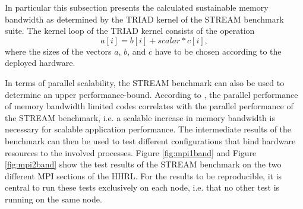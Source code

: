 In particular this subsection presents the calculated sustainable memory bandwidth as determined by the TRIAD kernel of the STREAM benchmark suite. The kernel loop of the TRIAD kernel consists of the operation
\begin{displaymath}
  a[i] = b[i] + scalar * c[i] ,
\end{displaymath}
where the sizes of the vectors \(a\), \(b\), and \(c\) have to be chosen according to the deployed hardware.

In terms of parallel scalability, the STREAM benchmark can also be used to determine an upper performance-bound. According to \cite{petsc-web-page}, the parallel performance of memory bandwidth limited codes correlates with the parallel performance of the STREAM benchmark, i.e. a scalable increase in memory bandwidth is necessary for scalable application performance. The intermediate results of the benchmark can then be used to test different configurations that bind hardware resources to the involved processes. Figure \ref{fig:mpi1band} and Figure \ref{fig:mpi2band} show the test results of the STREAM benchmark on the two different MPI sections of the HHRL. For the results to be reproducible, it is central to run these tests exclusively on each node, i.e. that no other test is running on the same node. %


%    
%
%    
%
%
%    

